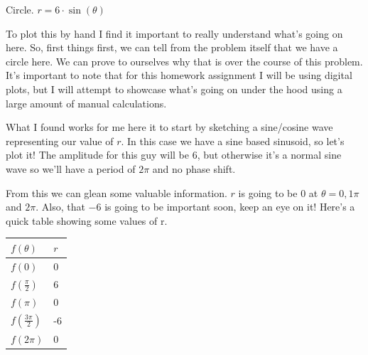 \begin{problem}
    Circle. $r = 6 \cdot \sin(\theta)$
\end{problem}

\begin{solution}
    To plot this by hand I find it important to really understand what's going on here. So, first things first, we can tell from the problem itself that we have a circle here. We can prove to ourselves why that is over the course of this problem. It's important to note that for this homework assignment I will be using digital plots, but I will attempt to showcase what's going on under the hood using a large amount of manual calculations. \medskip
    
    What I found works for me here it to start by sketching a sine/cosine wave representing our value of $r$. In this case we have a sine based sinusoid, so let's plot it! The amplitude for this guy will be 6, but otherwise it's a normal sine wave so we'll have a period of $2\pi$ and no phase shift.
    
    
    From this we can glean some valuable information. $r$ is going to be 0 at $\theta = 0, 1\pi$ and $2\pi$. Also, that $-6$ is going to be important soon, keep an eye on it! Here's a quick table showing some values of r. 
    
    \begin{center}
    \begin{tabular}{|l|l|}
    \hline
    $f(\theta)$ & $r$ \\ \hline
    $f(0)$ & $0$ \\ \hline
    $f(\frac{\pi}{2})$ & 6 \\ \hline
    $f(\pi)$ & 0 \\ \hline
    $f(\frac{3\pi}{2})$ & -6 \\ \hline
    $f(2\pi)$ & 0 \\ \hline
    \end{tabular}
    \end{center}
    

\end{solution}
